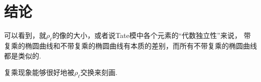 \section{结论}

可以看到，就$\rho_{\ell}$的像的大小，或者说Tate模中各个元素的“代数独立性”来说，
带复乘的椭圆曲线和不带复乘的椭圆曲线有本质的差别，而所有不带复乘的椭圆曲线都是类似的.

复乘现象能够很好地被$\rho_{\ell}$交换来刻画.